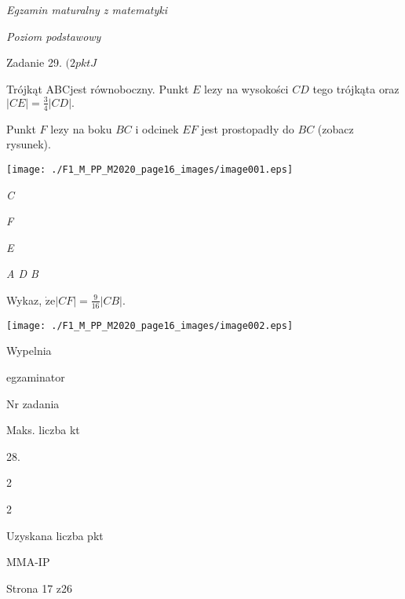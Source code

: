 \documentclass[a4paper,12pt]{article}
\begin{document}
{\it Egzamin maturalny z matematyki}

{\it Poziom podstawowy}

Zadanie 29. $(2pktJ$

Trójkąt ABCjest równoboczny. Punkt $E$ lezy na wysokości $CD$ tego trójkąta oraz $|CE|=\displaystyle \frac{3}{4}|CD|.$

Punkt $F$ lezy na boku $BC$ i odcinek $EF$ jest prostopadły do $BC$ (zobacz rysunek).
\begin{center}
\texttt{[image: ./F1\_M\_PP\_M2020\_page16\_images/image001.eps]}
\end{center}
{\it C}

{\it F}

{\it E}

{\it A  D  B}

Wykaz, $\displaystyle \dot{\mathrm{z}}\mathrm{e}|CF|=\frac{9}{16}|CB|.$
\begin{center}
\texttt{[image: ./F1\_M\_PP\_M2020\_page16\_images/image002.eps]}
\end{center}
Wypelnia

egzaminator

Nr zadania

Maks. liczba kt

28.

2

2

Uzyskana liczba pkt

MMA-IP

Strona 17 z26
\end{document}

